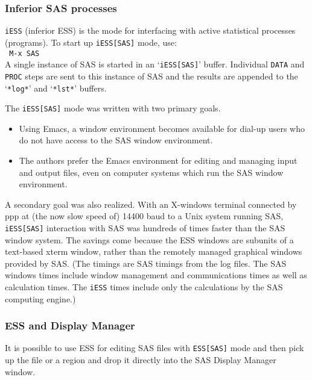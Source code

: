 \documentclass{article}
\newcommand{\stexttt}[1]{{\small\texttt{#1}}}
\newcommand{\ssf}[1]{{\small\sf{#1}}}
\newcommand{\elcode}[1]{\\{\stexttt{\hspace*{2em} #1}}\\}
\newcommand{\file}[1]{`\stexttt{#1}'}
\begin{document}
\subsubsection{Inferior SAS processes}
\label{sec:SAS:proc:inf}

\stexttt{iESS} (inferior ESS) is the mode for interfacing with active
statistical processes (programs).  To start up \stexttt{iESS[SAS]} mode,
use: \elcode{M-x SAS}
A single instance of SAS is started in an \file{iESS[SAS]} buffer.
Individual \stexttt{DATA} and \stexttt{PROC} steps are sent to this
instance of SAS and the results are appended to the \file{*log*} and
\file{*lst*} buffers.

The \stexttt{iESS[SAS]} mode was written with two primary goals.
\begin{itemize}
 \item Using Emacs, a window environment becomes available for dial-up
  users who do not have access to the SAS window environment.
 \item The authors prefer the Emacs environment for editing and managing
  input and output files, even on computer systems which run the SAS
  window environment.
\end{itemize}
A secondary goal was also realized.  With an X-windows terminal
connected by ppp at (the now slow speed of) 14400 baud to a Unix system
running SAS, \stexttt{iESS[SAS]} interaction with SAS was hundreds of
times faster than the SAS window system.  The savings come because the
ESS windows are subunits of a text-based xterm window, rather than the
remotely managed graphical windows provided by SAS.  (The timings are
SAS timings from the log files.  The SAS windows times include window
management and communications times as well as calculation times.  The
\stexttt{iESS} times include only the calculations by the SAS computing
engine.)

\subsubsection{ESS and Display Manager}
It is possible to use ESS for editing SAS files with \stexttt{ESS[SAS]} mode
and then pick up the file or a region and drop it directly into the SAS
Display Manager \ssf{Program Editor} window.
\end{document}

